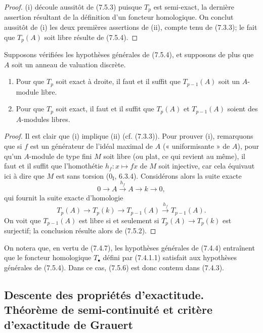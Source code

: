 \begin{proof}
(i) découle aussitôt de (7.5.3) puisque $T_p$ est semi-exact, la dernière
assertion résultant de la définition d'un foncteur homologique. On conclut
aussitôt de (i) les deux premières assertions de (ii), compte tenu de (7.3.3);
le fait que $T_p(A)$ soit libre résulte de (7.5.4).
\end{proof}

\begin{corollary}[7.5.6]
Supposons vérifiées les hypothèses générales de (7.5.4), et supposons de plus
que $A$ soit un anneau de valuation discrète.
\begin{enumerate}
  \item[(i)] Pour que $T_p$ soit exact à droite, il faut et il suffit que
    $T_{p-1}(A)$ soit un $A$-module libre.
  \item[(ii)] Pour que $T_p$ soit exact, il faut et il suffit que $T_p(A)$ et
    $T_{p-1}(A)$ soient des $A$-modules libres.
\end{enumerate}
\end{corollary}

\begin{proof}
Il est clair que (i) implique (ii) (cf. (7.3.3)). Pour prouver (i), remarquons
que si $f$ est un générateur de l'idéal maximal de $A$ (« uniformisante » de
$A$), pour qu'un $A$-module de type fini $M$ soit libre (ou plat, ce qui revient
au même), il faut et il suffit que l'homothétie $h_f:x\mapsto fx$ de $M$ soit
injective, car cela équivaut ici à dire que $M$ est sans torsion
($0_{\mathrm I}$, 6.3.4). Considérons alors la suite exacte
\[
  0\longrightarrow A\xrightarrow{h_f}A\longrightarrow k\longrightarrow0,
\]
qui fournit la suite exacte d'homologie
\[
  T_p(A)
  \longrightarrow T_p(k)
  \longrightarrow T_{p-1}(A)
  \xrightarrow{h_f}T_{p-1}(A).
\]
On voit que $T_{p-1}(A)$ est libre si et seulement si
$T_p(A)\to T_p(k)$ est surjectif; la conclusion résulte alors de (7.5.2).
\end{proof}

\begin{remark}[7.5.7]
On notera que, en vertu de (7.4.7), les hypothèses générales de (7.4.4)
entraînent que le foncteur homologique $T_\bullet$ défini par (7.4.1.1)
satisfait aux hypothèses générales de (7.5.4). Dans ce cas, (7.5.6) est donc
contenu dans (7.4.3).
\end{remark}

\subsection{Descente des propriétés d'exactitude. Théorème de semi-continuité
et critère d'exactitude de Grauert}
\label{subsection:III.7.6.fr}

